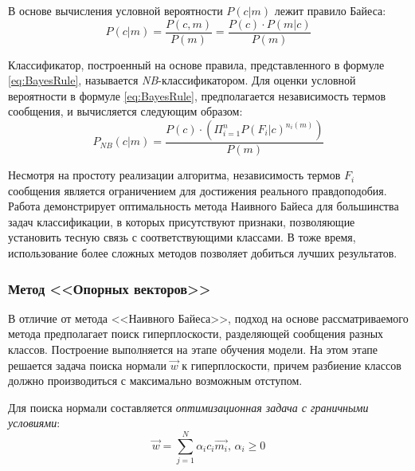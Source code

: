         В основе вычисления условной вероятности $P(c|m)$ лежит правило Байеса:
        \begin{equation}
            \label{eq:BayesRule}
            P(c|m) = \dfrac{P(c, m)}{P(m)} = \dfrac{P(c)\cdot P(m|c)}{P(m)}
        \end{equation}

        Классификатор, построенный на основе правила, представленного в
        формуле \ref{eq:BayesRule}, называется {\it NB}-классификатором.
        Для оценки условной вероятности в формуле \ref{eq:BayesRule}, предполагается
        независимость термов сообщения, и вычисляется следующим образом:
        \begin{equation}
            P_{NB} (c|m) = \dfrac{P(c)\cdot(\Pi_{i=1}^{n}P(F_i|c)^{n_i(m)})}{P(m)} \nonumber
        \end{equation}

        Несмотря на простоту реализации алгоритма, независимость термов $F_i$ сообщения
        является ограничением для достижения реального правдоподобия. Работа \cite{nbAdvantages}
        демонстрирует оптимальность метода Наивного Байеса для большинства задач
        классификации, в которых присутствуют признаки, позволяющие установить
        тесную связь с соответствующими классами. В тоже время, использование
        более сложных методов позволяет добиться лучших результатов.

        \subsubsection{Метод <<Опорных векторов>>}
        В отличие от метода <<Наивного Байеса>>, подход на основе рассматриваемого
        метода предполагает поиск гиперплоскости, разделяющей сообщения разных классов.
        Построение выполняется на этапе обучения модели. На этом этапе решается задача
        поиска нормали $\vec{w}$ к гиперплоскости, причем разбиение классов должно
        производиться с максимально возможным отступом.

        Для поиска нормали составляется {\it оптимизационная задача с граничными
        условиями}:
        \begin{equation}
            \label{eq:optimizationSVM}
            \vec{w} = \sum_{j=1}^{N} \alpha_i c_i \vec{m_i}, \hspace{2pt} \alpha_i \geq 0
        \end{equation}

